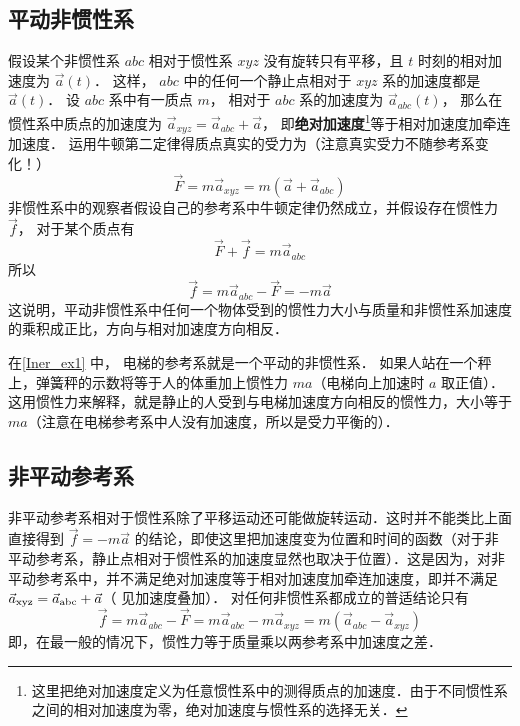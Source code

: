 \subsection{平动非惯性系}
假设某个非惯性系 $abc$ 相对于惯性系 $xyz$ 没有旋转只有平移，且 $t$ 时刻的相对加速度为 $\vec a(t)$． 这样， $abc$ 中的任何一个静止点相对于 $xyz$ 系的加速度都是 $\vec a(t)$． 设 $abc$ 系中有一质点 $m$， 相对于 $abc$ 系的加速度为 $\vec a_{abc} (t)$， 那么在惯性系中质点的加速度为 ${\vec a_{xyz}} = {\vec a_{abc}} + \vec a$， 即\textbf{绝对加速度}\footnote{这里把绝对加速度定义为任意惯性系中的测得质点的加速度．由于不同惯性系之间的相对加速度为零，绝对加速度与惯性系的选择无关．}等于相对加速度加牵连加速度． 运用牛顿第二定律得质点真实的受力为（注意真实受力不随参考系变化！）
\begin{equation}
\vec F = m {\vec a}_{xyz} = m(\vec a + {\vec a}_{abc} )
\end{equation}
非惯性系中的观察者假设自己的参考系中牛顿定律仍然成立，并假设存在惯性力 $\vec f$， 对于某个质点有
\begin{equation}
\vec F + \vec f = m \vec a_{abc}
\end{equation}
所以
\begin{equation}
\vec f = m{\vec a_{abc}} - \vec F =  - m\vec a
\end{equation}
这说明，平动非惯性系中任何一个物体受到的惯性力大小与质量和非惯性系加速度的乘积成正比，方向与相对加速度方向相反．

在\autoref{Iner_ex1} 中， 电梯的参考系就是一个平动的非惯性系． 如果人站在一个秤上，弹簧秤的示数将等于人的体重加上惯性力 $ma$（电梯向上加速时 $a$ 取正值）． 这用惯性力来解释，就是静止的人受到与电梯加速度方向相反的惯性力，大小等于 $ma$（注意在电梯参考系中人没有加速度，所以是受力平衡的）．

\subsection{非平动参考系}

非平动参考系相对于惯性系除了平移运动还可能做旋转运动．这时并不能类比上面直接得到 $\vec f =  - m\vec a$ 的结论，即使这里把加速度变为位置和时间的函数（对于非平动参考系，静止点相对于惯性系的加速度显然也取决于位置）．这是因为，对非平动参考系中，并不满足绝对加速度等于相对加速度加牵连加速度，即并不满足 ${\vec a_{{\rm{xyz}}}} = {\vec a_{{\rm{abc}}}} + \vec a$（ 见加速度叠加）． %
对任何非惯性系都成立的普适结论只有
\begin{equation}
\vec f = m{\vec a_{abc}} - \vec F = m{\vec a_{abc}} - m{\vec a_{xyz}} = m( \vec a_{abc} - \vec a_{xyz})
\end{equation}
即，在最一般的情况下，惯性力等于质量乘以两参考系中加速度之差．

